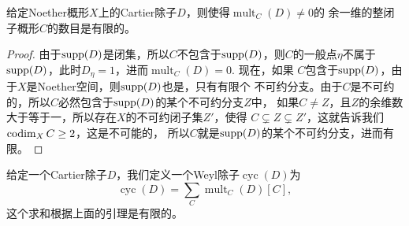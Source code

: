 \begin{lem}
给定Noether概形$X$上的Cartier除子$D$，则使得$\operatorname{mult}_C(D)\neq 0$的
余一维的整闭子概形$C$的数目是有限的。
\end{lem}

\begin{proof}
由于$\operatorname{supp}(D)$是闭集，所以$C$不包含于$\operatorname{supp}(D)$，则$C$的一般点$\eta$不属于
$\operatorname{supp}(D)$，此时$D_\eta=1$，进而$\operatorname{mult}_C(D)=0$. 现在，如果
$C$包含于$\operatorname{supp}(D)$，由于$X$是Noether空间，则$\operatorname{supp}(D)$也是，只有有限个
不可约分支。由于$C$是不可约的，所以$C$必然包含于$\operatorname{supp}(D)$的某个不可约分支$Z$中，
如果$C\neq Z$，且$Z$的余维数大于等于一，所以存在$X$的不可约闭子集$Z'$，使得
$C\subsetneq Z\subsetneq Z'$，这就告诉我们$\operatorname{codim}_X C\geq 2$，这是不可能的，
所以$C$就是$\operatorname{supp}(D)$的某个不可约分支，进而有限。
\end{proof}

\begin{para}[Cartier除子与Weyl除子]
    给定一个Cartier除子$D$，我们定义一个Weyl除子$\operatorname{cyc}(D)$为
    \[
        \operatorname{cyc}(D)=\sum_C \operatorname{mult}_C(D) [C],
    \]
    这个求和根据上面的引理是有限的。
\end{para}
